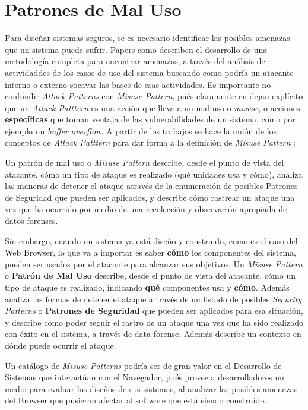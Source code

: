 \section{Patrones de Mal Uso}
Para diseñar sistemas seguros, se es necesario identificar las posibles amenazas que un sistema puede sufrir. Papers como \cite{fernandez2006defining, fernandez2007attack, braz2008eliciting, fernandez2013security} describen el desarrollo de una metodología completa para encontrar amenazas, a través del análisis de actividaddes de los casos de uso del sistema buscando como podría un atacante interno o externo socavar las bases de esas actividades. Es importante no confundir \textit{Attack Patterns} con \textit{Misuse Pattern}, pués claramente en \cite{ModMisusePatt, fernandez2013security} dejan explícito que un \textit{Attack Patttern} es una acción que lleva a un mal uso o \textit{misuse}, o acciones \textbf{específicas} que toman ventaja de las vulnerabilidades de un sistema, como por ejemplo un \textit{buffer overflow}. A partir de los trabajos \cite{fernandez2007attack, yoshioka2006development, yoshioka2007integration}  se hace la unión de los conceptos de \textit{Attack Patttern} para dar forma a la definición de \textit{Misuse Pattern} \cite{ModMisusePatt, pelaez2009misuse, fernandez2010worm, hashizume2011misuse, munoz2011misuse, fernandez2012misuse, alkazimi2014, encinamisuse}:
\begin{center}
    Un patrón de mal uso o \textit{Misuse Pattern} describe, desde el punto de vista del atacante, cómo un tipo de ataque es realizado (qué unidades usa y cómo), analiza las maneras de detener el ataque através de la enumeración de posibles Patrones de Seguridad que pueden ser aplicados, y describe cómo rastrear un ataque una vez que ha ocurrido por medio de una recolección y observación apropiada de datos forenses.
\end{center}

Sin embargo, cuando un sistema ya está diseño y construido, como es el caso del Web Browser, lo que va a importar es saber \textbf{cómo} los componentes del sistema, pueden ser usados por el atacante para alcanzar sus objetivos. Un \textit{Misuse Pattern} o \textbf{Patrón de Mal Uso} describe, desde el punto de vista del atacante, cómo un tipo de ataque es realizado, indicando \textbf{qué} componentes usa y \textbf{cómo}. Además analiza las formas de detener el ataque a través de un listado de posibles \textit{Security Patterns} o \textbf{Patrones de Seguridad} que pueden ser aplicados para esa situación, y describe cómo poder seguir el rastro de un ataque una vez que ha sido realizado con éxito en el sistema, a través de data forense. Además describe un contexto en dónde puede ocurrir el ataque.

Un catálogo de \textit{Misuse Patterns} podría ser de gran valor en el Desarrollo de Sistemas que interactúan con el Navegador, pués provee a desarrolladores un medio para evaluar los diseños de sus sistemas, al analizar las posibles amenazas del Browser que pusieran afectar al software que está siendo construído.
